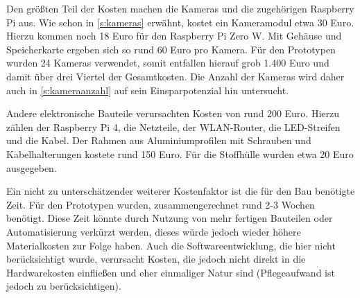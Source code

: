 \documentclass[./00PhotoBox.tex]{subfiles}
\begin{document}
Den größten Teil der Kosten machen die Kameras und die zugehörigen Raspberry Pi aus. Wie schon in \autoref{s:kameras} erwähnt, kostet ein Kameramodul etwa 30 Euro. Hierzu kommen noch 18 Euro für den Raspberry Pi Zero W. Mit Gehäuse und Speicherkarte ergeben sich so rund 60 Euro pro Kamera. Für den Prototypen wurden 24 Kameras verwendet, somit entfallen hierauf grob 1.400 Euro und damit über drei Viertel der Gesamtkosten. Die Anzahl der Kameras wird daher auch in \autoref{s:kameraanzahl} auf sein Einsparpotenzial hin untersucht.

Andere elektronische Bauteile verursachten Kosten von rund 200 Euro. Hierzu zählen der Raspberry Pi 4, die Netzteile, der WLAN-Router, die LED-Streifen und die Kabel. Der Rahmen aus Aluminiumprofilen mit Schrauben und Kabelhalterungen kostete rund 150 Euro. Für die Stoffhülle wurden etwa 20 Euro ausgegeben.

Ein nicht zu unterschätzender weiterer Kostenfaktor ist die für den Bau benötigte Zeit. Für den Prototypen wurden, zusammengerechnet rund 2-3 Wochen benötigt. Diese Zeit könnte durch Nutzung von mehr fertigen Bauteilen oder Automatisierung verkürzt werden, dieses würde jedoch wieder höhere Materialkosten zur Folge haben. Auch die Softwareentwicklung, die hier nicht berücksichtigt wurde, verursacht Kosten, die jedoch nicht direkt in die Hardwarekosten einfließen und eher einmaliger Natur sind (Pflegeaufwand ist jedoch zu berücksichtigen).

\biblio
\end{document}
